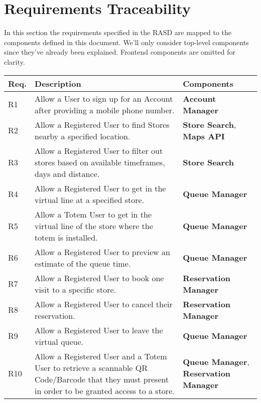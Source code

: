 
\section{Requirements Traceability}

In this section the requirements specified in the RASD are mapped to the components defined in this document. We'll only consider top-level components since they've already been explained. Frontend components are omitted for clarity.

\def\arraystretch{1.5}
\begin{longtable}{p{} p{} p{}}
    \textbf{Req.} & \textbf{Description} & \textbf{Components}\\
    \hline
    R1 & Allow a User to sign up for an Account after providing a mobile phone number. & \textbf{Account Manager}\\
    R2 & Allow a Registered User to find Stores nearby a specified location. & \textbf{Store Search}, \textbf{Maps API}\\
    R3 & Allow a Registered User to filter out stores based on available timeframes, days and distance. & \textbf{Store Search}\\
    R4 & Allow a Registered User to get in the virtual line at a specified store. & \textbf{Queue Manager}\\
    R5 & Allow a Totem User to get in the virtual line of the store where the totem is installed. & \textbf{Queue Manager}\\
    R6 & Allow a Registered User to preview an estimate of the queue time. & \textbf{Queue Manager}\\
    R7 & Allow a Registered User to book one visit to a specific store. & \textbf{Reservation Manager}\\
    R8 & Allow a Registered User to cancel their reservation. & \textbf{Reservation Manager}\\
    R9 & Allow a Registered User to leave the virtual queue. & \textbf{Queue Manager}\\
    R10 & Allow a Registered User and a Totem User to retrieve a scannable QR Code/Barcode that they must present in order to be granted access to a store. & \textbf{Queue Manager}, \textbf{Reservation Manager}\\


\end{longtable}
